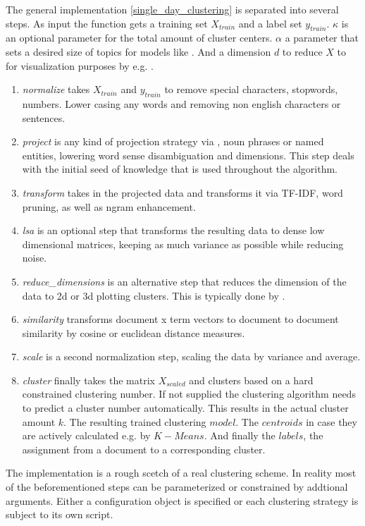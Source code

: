   The general implementation \ref{single_day_clustering} is separated into several steps. As input the function gets a training set $X_{train}$ and a label set $y_{train}$. $\kappa$ is an optional parameter for the total amount of cluster centers. $\alpha$ a parameter that sets a desired size of topics for models like \lsa{}. And a dimension $d$ to reduce $X$ to for visualization purposes by e.g. \pca{}.

    \begin{enumerate}
      \item \emph{normalize} takes $X_{train}$ and $y_{train}$ to remove special characters, stopwords, numbers. Lower casing any words and removing non english characters or sentences. 
      \item \emph{project} is any kind of projection strategy via \wordnet{}, noun phrases or named entities, lowering word sense disambiguation and dimensions. This step deals with the initial seed of knowledge that is used throughout the algorithm.
      \item \emph{transform} takes in the projected data and transforms it via TF-IDF, word pruning, as well as ngram enhancement.
      \item \emph{lsa} is an optional step that transforms the resulting data to dense low dimensional matrices, keeping as much variance as possible while reducing noise.
      \item \emph{reduce\_dimensions} is an alternative step that reduces the dimension of the data to 2d or 3d plotting clusters. This is typically done by \pca{}.
      \item \emph{similarity} transforms document x term vectors to document to document similarity by cosine or euclidean distance measures.
      \item \emph{scale} is a second normalization step, scaling the data by variance and average.
      \item \emph{cluster} finally takes the matrix $X_{scaled}$ and clusters based on a hard constrained clustering number. If not supplied the clustering algorithm needs to predict a cluster number automatically. This results in the actual cluster amount $k$. The resulting trained clustering $model$. The $centroids$ in case they are actively calculated e.g. by $K-Means$. And finally the $labels$, the assignment from a document to a corresponding cluster.
    \end{enumerate}

  The implementation is a rough scetch of a real clustering scheme. In reality most of the beforementioned steps can be parameterized or constrained by addtional arguments. Either a configuration object is specified or each clustering strategy is subject to its own script.
  
